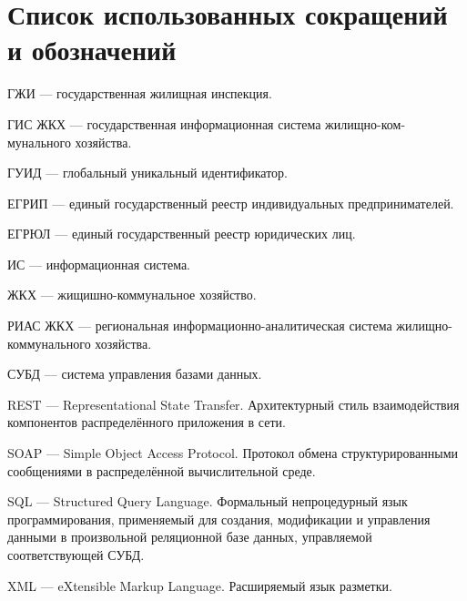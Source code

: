 \section*{Список использованных сокращений и обозначений}

ГЖИ --- государственная жилищная инспекция.

ГИС ЖКХ --- государственная информационная система жилищно-ком-\linebreak мунального хозяйства.

ГУИД --- глобальный уникальный идентификатор.

ЕГРИП --- единый государственный реестр индивидуальных предпринимателей.

ЕГРЮЛ --- единый государственный реестр юридических лиц.

ИС --- информационная система.

ЖКХ --- жищишно-коммунальное хозяйство.

РИАС ЖКХ --- региональная информационно-аналитическая система жилищно-коммунального хозяйства.

СУБД --- система управления базами данных.

REST --- Representational State Transfer. Архитектурный стиль взаимодействия компонентов распределённого приложения в сети.

SOAP --- Simple Object Access Protocol. Протокол обмена структурированными сообщениями в распределённой вычислительной среде.

SQL --- Structured Query Language. Формальный непроцедурный язык программирования, применяемый для создания, модификации и управления данными в произвольной реляционной базе данных, управляемой соответствующей СУБД.

XML --- eXtensible Markup Language. Расширяемый язык разметки.

\clearpage
\newpage